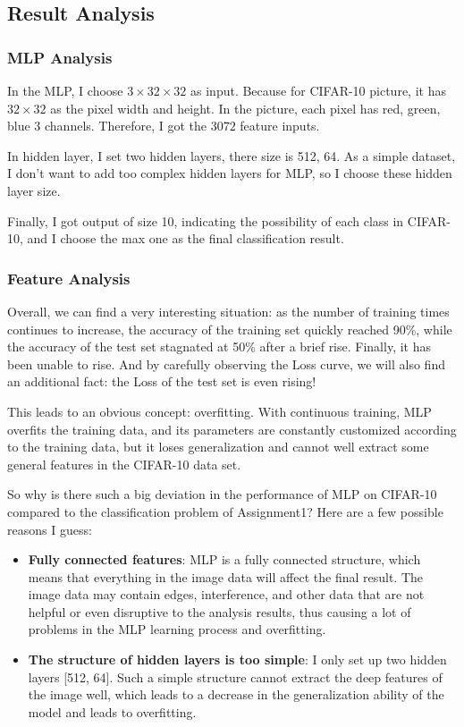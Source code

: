 \documentclass{article}
\begin{document}
\subsection{Result Analysis}

\subsubsection{MLP Analysis}

In the MLP, I choose $3 \times 32 \times 32$ as input. Because for CIFAR-10 picture, it has $32 \times 32$ as the pixel width and height. In the picture, each pixel has red, green, blue 3 channels. Therefore, I got the $3072$ feature inputs.

In hidden layer, I set two hidden layers, there size is 512, 64. As a simple dataset, I don't want to add too complex hidden layers for MLP, so I choose these hidden layer size.

Finally, I got output of size 10, indicating the possibility of each class in CIFAR-10, and I choose the max one as the final classification result.

\subsubsection{Feature Analysis}

Overall, we can find a very interesting situation: as the number of training times continues to increase, the accuracy of the training set quickly reached 90\%, while the accuracy of the test set stagnated at 50\% after a brief rise. Finally, it has been unable to rise. And by carefully observing the Loss curve, we will also find an additional fact: the Loss of the test set is even rising!

This leads to an obvious concept: overfitting. With continuous training, MLP overfits the training data, and its parameters are constantly customized according to the training data, but it loses generalization and cannot well extract some general features in the CIFAR-10 data set.

So why is there such a big deviation in the performance of MLP on CIFAR-10 compared to the classification problem of Assignment1? Here are a few possible reasons I guess:

\begin{itemize}
    \item \textbf{Fully connected features}: MLP is a fully connected structure, which means that everything in the image data will affect the final result. The image data may contain edges, interference, and other data that are not helpful or even disruptive to the analysis results, thus causing a lot of problems in the MLP learning process and overfitting.
    \item \textbf{The structure of hidden layers is too simple}: I only set up two hidden layers [512, 64]. Such a simple structure cannot extract the deep features of the image well, which leads to a decrease in the generalization ability of the model and leads to overfitting.
\end{itemize}
\end{document}
